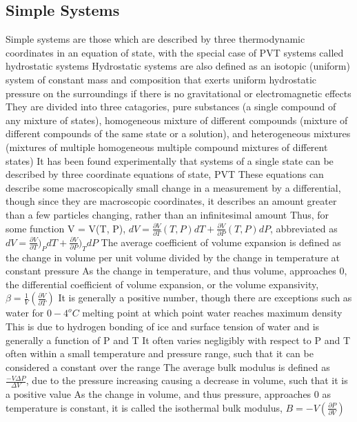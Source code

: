 \documentclass[11 pt, twoside]{article}
\newenvironment{outline*}
{
	\begin{outline}[enumerate]
	}
	{\end{outline}
}
\begin{document}
\subsection{Simple Systems}
\begin{outline*}
\1 Simple systems are those which are described by three thermodynamic coordinates in an equation of state, with the special case of PVT systems called hydrostatic systems
\1 Hydrostatic systems are also defined as an isotopic (uniform) system of constant mass and composition that exerts uniform hydrostatic pressure on the surroundings if there is no gravitational or electromagnetic effects
\2 They are divided into three catagories, pure substances (a single compound of any mixture of states), homogeneous mixture of different compounds (mixture of different compounds of the same state or a solution), and heterogeneous mixtures (mixtures of multiple homogeneous multiple compound mixtures of different states)
\3 It has been found experimentally that systems of a single state can be described by three coordinate equations of state, PVT
\2 These equations can describe some macroscopically small change in a measurement by a differential, though since they are macroscopic coordinates, it describes an amount greater than a few particles changing, rather than an infinitesimal amount
\2 Thus, for some function V = V(T, P), $dV = \frac{\partial V}{\partial T}(T, P)dT + \frac{\partial V}{\partial P}(T, P)dP$, abbreviated as $dV = \frac{\partial V}{\partial T})_PdT + \frac{\partial V}{\partial P})_TdP$
\3 The average coefficient of volume expansion is defined as the change in volume per unit volume divided by the change in temperature at constant pressure
\4 As the change in temperature, and thus volume, approaches 0, the differential coefficient of volume expansion, or the volume expansivity, $\beta = \frac{1}{V}(\frac{\partial V}{\partial T})$
\4 It is generally a positive number, though there are exceptions such as water for $0-4^o C$ melting point at which point water reaches maximum density
\4 This is due to hydrogen bonding of ice and surface tension of water and is generally a function of P and T
\4 It often varies negligibly with respect to P and T often within a small temperature and pressure range, such that it can be considered a constant over the range
\3 The average bulk modulus is defined as $\frac{-V\Delta P}{\Delta V}$, due to the pressure increasing causing a decrease in volume, such that it is a positive value
\4 As the change in volume, and thus pressure, approaches 0 as temperature is constant, it is called the isothermal bulk modulus, $B = -V(\frac{\partial P}{\partial V})$

\end{outline*}
\end{document}
